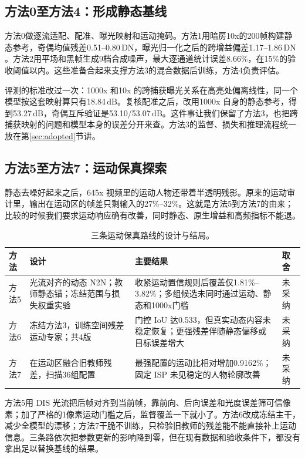 \documentclass[11pt,a4paper,UTF8,fontset=fandol]{ctexart}
\newcommand{\dn}{\ensuremath{\,\mathrm{DN}}}
\newcommand{\db}{\ensuremath{\,\mathrm{dB}}}
\begin{document}
\subsection{方法0至方法4：形成静态基线}

方法0做逐流适配、配准、曝光映射和运动掩码。方法1用暗房10x的200帧构建静态参考，奇偶均值残差0.51--0.80\dn，曝光归一化之后的跨增益偏差1.17--1.86\dn。方法2用平场和黑帧生成9档合成噪声，最大逐通道统计误差8.66\%，在15\%的验收阈值以内。这些准备合起来支撑方法3的混合数据后训练，方法4负责评估。

评测的标准改过一次：1000x 和10x 的跨捕获曝光关系在高亮处偏离线性，同一个模型按这套映射算只有18.84\db。复核配准之后，改用1000x 自身的静态参考，得到53.27\db，奇偶互斥验证是53.10/53.07\db。这件事让我们保留了方法3，也把跨捕获映射的问题和模型本身的误差分开来查。方法3的监督、损失和推理流程统一放在第\ref{sec:adopted}节讲。

\subsection{方法5至方法7：运动保真探索}

静态去噪好起来之后，645x 视频里的运动人物还带着半透明残影。原来的运动审计里，输出在运动区的帧差只剩输入的27\%--32\%。这就是方法5到方法7的由来；比较的时候我们要求运动响应确有改善，同时静态、原生增益和高频指标不能退。

\begin{table}[!htbp]
\centering\small
\caption{三条运动保真路线的设计与结局。}
\label{tab:motion_trials}
\begin{tabular}{P{0.10\textwidth}P{0.30\textwidth}P{0.38\textwidth}P{0.10\textwidth}}
\toprule
方法 & 设计 & 主要结果 & 取舍 \\
\midrule
方法5 & 光流对齐的动态 N2N；教师静态锚；冻结范围与损失权重实验 & 收紧运动置信规则后覆盖仅1.81\%--3.82\%；多组候选未同时通过运动、静态和1000x门槛 & 未采纳 \\
方法6 & 冻结方法3，训练空间残差运动专家；共4版 & 门控 IoU 达0.533，但真实动态内容未稳定恢复；更强残差伴随静态偏移或目标误差增大 & 未采纳 \\
方法7 & 在运动区融合旧教师残差，扫描36组配置 & 最强配置的运动比相对增加0.9162\%；固定 ISP 未见稳定的人物轮廓改善 & 未采纳 \\
\bottomrule
\end{tabular}
\end{table}

方法5用 DIS 光流把后帧对齐到当前帧，靠前向、后向误差和光度误差筛可信像素；加了严格的1像素运动门槛之后，监督覆盖一下就小了。方法6改成冻结主干，减少全模型的漂移；方法7干脆不训练，只检验旧教师的残差能不能直接补上运动信息。三条路依次把参数更新的影响降到零，但在现有数据和验收条件下，都没有拿出足以替换基线的结果。
\end{document}
